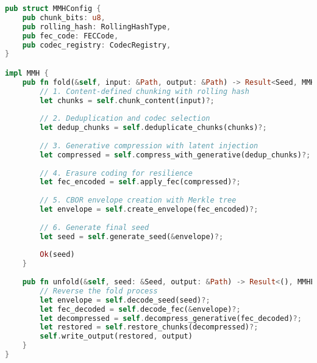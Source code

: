 \begin{lstlisting}[language=rust,caption={MMH Core Algorithm},label=lst:mmh-algorithm]
pub struct MMHConfig {
    pub chunk_bits: u8,
    pub rolling_hash: RollingHashType,
    pub fec_code: FECCode,
    pub codec_registry: CodecRegistry,
}

impl MMH {
    pub fn fold(&self, input: &Path, output: &Path) -> Result<Seed, MMHError> {
        // 1. Content-defined chunking with rolling hash
        let chunks = self.chunk_content(input)?;
        
        // 2. Deduplication and codec selection
        let dedup_chunks = self.deduplicate_chunks(chunks)?;
        
        // 3. Generative compression with latent injection
        let compressed = self.compress_with_generative(dedup_chunks)?;
        
        // 4. Erasure coding for resilience
        let fec_encoded = self.apply_fec(compressed)?;
        
        // 5. CBOR envelope creation with Merkle tree
        let envelope = self.create_envelope(fec_encoded)?;
        
        // 6. Generate final seed
        let seed = self.generate_seed(&envelope)?;
        
        Ok(seed)
    }
    
    pub fn unfold(&self, seed: &Seed, output: &Path) -> Result<(), MMHError> {
        // Reverse the fold process
        let envelope = self.decode_seed(seed)?;
        let fec_decoded = self.decode_fec(&envelope)?;
        let decompressed = self.decompress_generative(fec_decoded)?;
        let restored = self.restore_chunks(decompressed)?;
        self.write_output(restored, output)
    }
}
\end{lstlisting} 